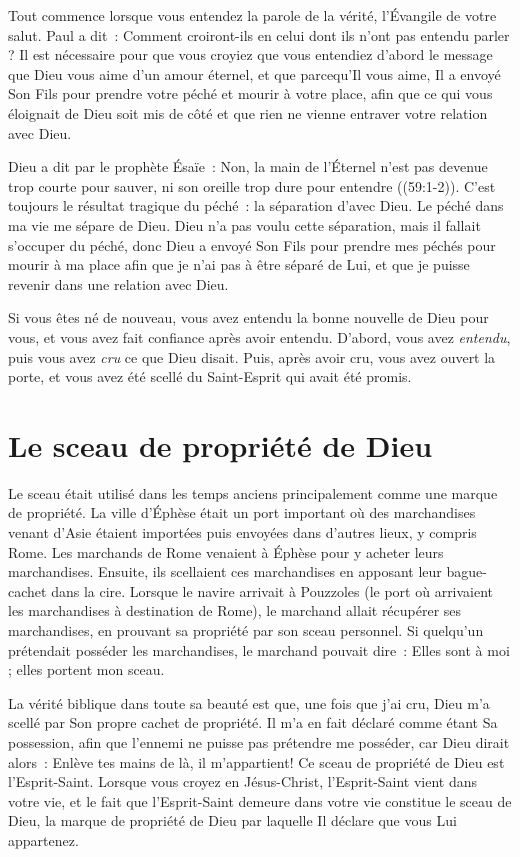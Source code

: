 Tout commence lorsque vous entendez \og la parole de la vérité,
 l'Évangile de votre salut. \fg{} Paul a dit~:
 \og Comment croiront-ils en celui dont ils n'ont pas entendu parler ? \fg{}
 Il est nécessaire pour que vous croyiez que vous entendiez d'abord le message
 que Dieu vous aime d'un amour éternel, et que parcequ'Il vous aime,
 Il a envoyé Son Fils pour prendre votre péché et mourir à votre place,
 afin que ce qui vous éloignait de Dieu soit mis de côté et que rien
 ne vienne entraver votre relation avec Dieu.

Dieu a dit par le prophète Ésaïe~:
 \og Non, la main de l'Éternel n'est pas devenue trop courte pour sauver,
 ni son oreille trop dure pour entendre \fg{} ((59:1-2)).
 C'est toujours le résultat tragique du péché~: la séparation d'avec Dieu.
 Le péché dans ma vie me sépare de Dieu.
 Dieu n'a pas voulu cette séparation, mais il fallait s'occuper du péché,
 donc Dieu a envoyé Son Fils pour prendre mes péchés
 \ocadr pour mourir à ma place \ocadr afin que je n'ai pas
 à être séparé de Lui, et que je puisse revenir
 dans une relation avec Dieu.

Si vous êtes né de nouveau, vous avez entendu
 la bonne nouvelle de Dieu pour vous, et vous avez fait confiance
 après avoir entendu. D'abord, vous avez \emph{entendu},
 puis vous avez \emph{cru} ce que Dieu disait.
 Puis, après avoir cru, vous avez ouvert la porte,
 et vous avez été \og scellé du Saint-Esprit qui avait été promis. \fg{}


\section*{Le sceau de propriété de Dieu}

Le sceau était utilisé dans les temps anciens principalement
 comme une marque de propriété.
 La ville d'Éphèse était un port important où des marchandises
 venant d'Asie étaient importées puis envoyées dans d'autres lieux,
 y compris Rome.
 Les marchands de Rome venaient à Éphèse pour y acheter leurs marchandises.
 Ensuite, ils scellaient ces marchandises en apposant leur bague-cachet
 dans la cire.
 Lorsque le navire arrivait à Pouzzoles
 (le port où arrivaient les marchandises à destination de Rome),
 le marchand allait récupérer ses marchandises,
 en prouvant sa propriété par son sceau personnel.
 Si quelqu'un prétendait posséder les marchandises,
 le marchand pouvait dire~:
 \og Elles sont à moi ; elles portent mon sceau. \fg{}

La vérité biblique dans toute sa beauté est que, une fois que j'ai cru,
 Dieu m'a scellé par Son propre cachet de propriété.
 Il m'a en fait déclaré comme étant Sa possession, afin que l'ennemi
 ne puisse pas prétendre me posséder, car Dieu dirait alors~:
 \og  Enlève tes mains de là, il m'appartient! \fg{}
 Ce sceau de propriété de Dieu est l'Esprit-Saint.
 Lorsque vous croyez en Jésus-Christ, l'Esprit-Saint vient dans votre vie,
 et le fait que l'Esprit-Saint demeure dans votre vie
 constitue le sceau de Dieu, la marque de propriété de Dieu
 par laquelle Il déclare que vous Lui appartenez.


